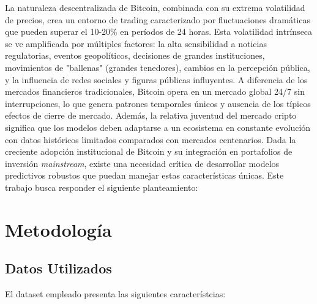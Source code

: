\documentclass[12pt]{article}
\begin{document}
La naturaleza descentralizada de Bitcoin, combinada con su extrema volatilidad de precios, crea un entorno de trading caracterizado por fluctuaciones dramáticas que pueden superar el 10-20\% en períodos de 24 horas. Esta volatilidad intrínseca se ve amplificada por múltiples factores: la alta sensibilidad a noticias regulatorias, eventos geopolíticos, decisiones de grandes instituciones, movimientos de "ballenas" (grandes tenedores), cambios en la percepción pública, y la influencia de redes sociales y figuras públicas influyentes.
A diferencia de los mercados financieros tradicionales, Bitcoin opera en un mercado global 24/7 sin interrupciones, lo que genera patrones temporales únicos y ausencia de los típicos efectos de cierre de mercado. Además, la relativa juventud del mercado cripto significa que los modelos deben adaptarse a un ecosistema en constante evolución con datos históricos limitados comparados con mercados centenarios.
Dada la creciente adopción institucional de Bitcoin y su integración en portafolios de inversión \textit{mainstream}, existe una necesidad crítica de desarrollar modelos predictivos robustos que puedan manejar estas características únicas. Este trabajo busca responder el siguiente planteamiento:


\begin{center}
\end{center}


\newpage
\section{Metodología}
\label{sec:metodologia}

\subsection{Datos Utilizados}
El dataset empleado presenta las siguientes característcias:
\end{document}
